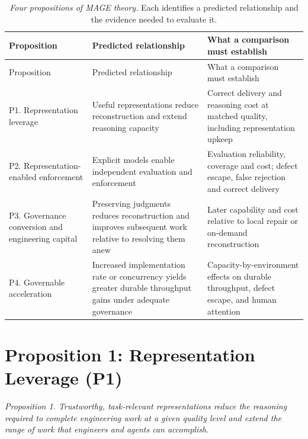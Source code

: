 {\footnotesize
\begin{longtable}[]{@{}
  >{\raggedright\arraybackslash}p{}
  >{\raggedright\arraybackslash}p{}
  >{\raggedright\arraybackslash}p{}@{}}
\caption[Four propositions of MAGE theory]{\emph{Four propositions of MAGE theory.} Each identifies a predicted relationship and the evidence needed to evaluate it.}\label{mage-propositions}\tabularnewline
\toprule\noalign{}
Proposition & Predicted relationship & What a comparison must establish \\
\midrule\noalign{}
\endfirsthead
\toprule\noalign{}
Proposition & Predicted relationship & What a comparison must establish \\
\midrule\noalign{}
\endhead
\bottomrule\noalign{}
\endlastfoot
P1. Representation leverage & Useful representations reduce reconstruction and extend reasoning capacity & Correct delivery and reasoning cost at matched quality, including representation upkeep \\
P2. Representation-enabled enforcement & Explicit models enable independent evaluation and enforcement & Evaluation reliability, coverage and cost; defect escape, false rejection and correct delivery \\
P3. Governance conversion and engineering capital & Preserving judgments reduces reconstruction and improves subsequent work relative to resolving them anew & Later capability and cost relative to local repair or on-demand reconstruction \\
P4. Governable acceleration & Increased implementation rate or concurrency yields greater durable throughput gains under adequate governance & Capacity-by-environment effects on durable throughput, defect escape, and human attention \\
\end{longtable}
}

\section{Proposition 1: Representation Leverage (P1)}\label{heading:p1-representation-leverage}


\emph{Proposition 1. Trustworthy, task-relevant representations reduce the reasoning required to complete engineering work at a given quality level and extend the range of work that engineers and agents can accomplish.}

